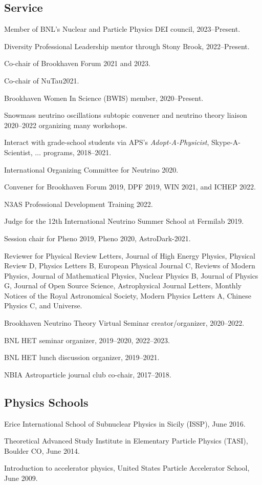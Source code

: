 \documentclass{article}
\renewenvironment{itemize}{
\begin{list}{}{
\setlength{\leftmargin}{.5em}}}{
\end{list}}
\begin{document}
\subsection*{Service}
\begin{itemize}
\item Member of BNL's Nuclear and Particle Physics DEI council, 2023--Present.
\item Diversity Professional Leadership mentor through Stony Brook, 2022--Present.
\item Co-chair of Brookhaven Forum 2021 and 2023.
\item Co-chair of NuTau2021.
\item Brookhaven Women In Science (BWIS) member, 2020--Present.
\item Snowmass neutrino oscillations subtopic convener and neutrino theory liaison 2020--2022 organizing many workshops.
\item Interact with grade-school students via APS's \emph{Adopt-A-Physicist}, Skype-A-Scientist, $\dots$ programs, 2018--2021.
\item International Organizing Committee for Neutrino 2020.
\item Convener for Brookhaven Forum 2019, DPF 2019, WIN 2021, and ICHEP 2022.
\item N3AS Professional Development Training 2022.
\item Judge for the 12th International Neutrino Summer School at Fermilab 2019. 
\item Session chair for Pheno 2019, Pheno 2020, AstroDark-2021.
\item Reviewer for Physical Review Letters, Journal of High Energy Physics, Physical Review D, Physics Letters B, European Physical Journal C, Reviews of Modern Physics, Journal of Mathematical Physics, Nuclear Physics B, Journal of Physics G, Journal of Open Source Science, Astrophysical Journal Letters, Monthly Notices of the Royal Astronomical Society, Modern Physics Letters A, Chinese Physics C, and Universe.
\item Brookhaven Neutrino Theory Virtual Seminar creator/organizer, 2020--2022.
\item BNL HET seminar organizer, 2019--2020, 2022--2023.
\item BNL HET lunch discussion organizer, 2019--2021.
\item NBIA Astroparticle journal club co-chair, 2017--2018.
\end{itemize}

\subsection*{Physics Schools}
\begin{itemize}
\item Erice International School of Subnuclear Physics in Sicily (ISSP), June 2016.
\item Theoretical Advanced Study Institute in Elementary Particle Physics (TASI), Boulder CO, June 2014.
\item Introduction to accelerator physics, United States Particle Accelerator School, June 2009.
\end{itemize}
\end{document}
